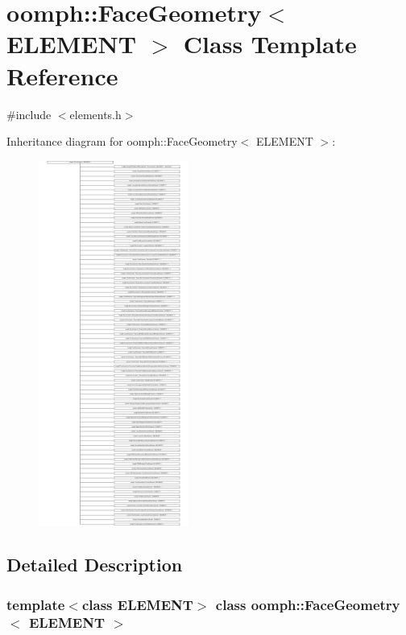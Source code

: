\hypertarget{classoomph_1_1FaceGeometry}{}\section{oomph\+:\+:Face\+Geometry$<$ E\+L\+E\+M\+E\+NT $>$ Class Template Reference}
\label{classoomph_1_1FaceGeometry}


{\ttfamily \#include $<$elements.\+h$>$}

Inheritance diagram for oomph\+:\+:Face\+Geometry$<$ E\+L\+E\+M\+E\+NT $>$\+:\begin{figure}[H]
\begin{center}
\leavevmode
\includegraphics[height=12.000000cm]{classoomph_1_1FaceGeometry}
\end{center}
\end{figure}


\subsection{Detailed Description}
\subsubsection*{template$<$class E\+L\+E\+M\+E\+NT$>$\newline
class oomph\+::\+Face\+Geometry$<$ E\+L\+E\+M\+E\+N\+T $>$}

